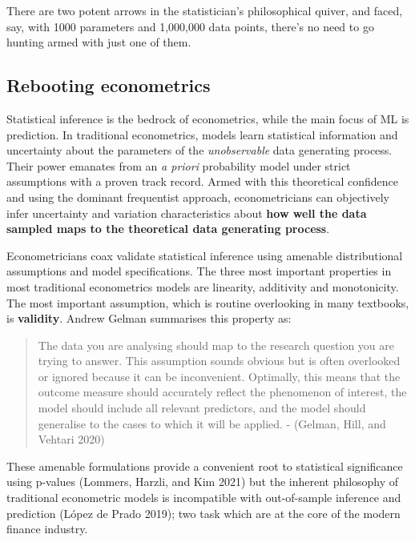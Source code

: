 \documentclass{article}
\begin{document}
There are two potent arrows in the statistician's philosophical quiver,
and faced, say, with 1000 parameters and 1,000,000 data points, there's
no need to go hunting armed with just one of them.

\hypertarget{rebooting-econometrics}{%
\subsection{Rebooting econometrics}\label{rebooting-econometrics}}

Statistical inference is the bedrock of econometrics, while the main
focus of ML is prediction. In traditional econometrics, models learn
statistical information and uncertainty about the parameters of the
\emph{unobservable} data generating process. Their power emanates from
an \emph{a priori} probability model under strict assumptions with a
proven track record. Armed with this theoretical confidence and using
the dominant frequentist approach, econometricians can objectively infer
uncertainty and variation characteristics about \textbf{how well the
data sampled maps to the theoretical data generating process}.

Econometricians coax validate statistical inference using amenable
distributional assumptions and model specifications. The three most
important properties in most traditional econometrics models are
linearity, additivity and monotonicity. The most important assumption,
which is routine overlooking in many textbooks, is \textbf{validity}.
Andrew Gelman summarises this property as:

\begin{quote}
The data you are analysing should map to the research question you are
trying to answer. This assumption sounds obvious but is often overlooked
or ignored because it can be inconvenient. Optimally, this means that
the outcome measure should accurately reflect the phenomenon of
interest, the model should include all relevant predictors, and the
model should generalise to the cases to which it will be applied. -
(Gelman, Hill, and Vehtari 2020)
\end{quote}

These amenable formulations provide a convenient root to statistical
significance using p-values (Lommers, Harzli, and Kim 2021) but the
inherent philosophy of traditional econometric models is incompatible
with out-of-sample inference and prediction (López de Prado 2019); two
task which are at the core of the modern finance industry.
\end{document}

